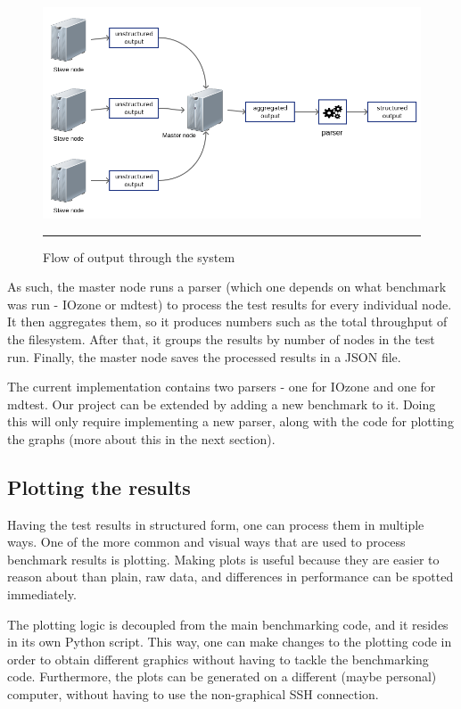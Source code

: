 \begin{figure}[H]
  \centering
    \includegraphics[scale=0.5]{Figures/output_flow.png}
    \rule{25em}{0.5pt}
  \caption[Flow of output through the system]{Flow of output through the system}
  \label{fig:output_flow}
\end{figure}


As such, the master node runs a parser (which one depends on what benchmark was run - IOzone or mdtest) to process the test results for every individual node. It then aggregates them, so it produces numbers such as the total throughput of the filesystem. After that, it groups the results by number of nodes in the test run. Finally, the master node saves the processed results in a JSON file.

The current implementation contains two parsers - one for IOzone and one for mdtest. Our project can be extended by adding a new benchmark to it. Doing this will only require implementing a new parser, along with the code for plotting the graphs (more about this in the next section).


\subsection{Plotting the results}

Having the test results in structured form, one can process them in multiple ways. One of the more common and visual ways that are used to process benchmark results is plotting. Making plots is useful because they are easier to reason about than plain, raw data, and differences in performance can be spotted immediately.

The plotting logic is decoupled from the main benchmarking code, and it resides in its own Python script. This way, one can make changes to the plotting code in order to obtain different graphics without having to tackle the benchmarking code. Furthermore, the plots can be generated on a different (maybe personal) computer, without having to use the non-graphical SSH connection.

